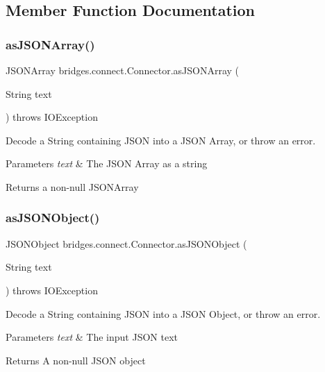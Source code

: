 \subsection{Member Function Documentation}
\mbox{\label{classbridges_1_1connect_1_1_connector_aa5bd647713545fa24c6d730eacb6bc54}} 
\subsubsection{\texorpdfstring{asJSONArray()}{asJSONArray()}}
{\footnotesize\ttfamily J\+S\+O\+N\+Array bridges.\+connect.\+Connector.\+as\+J\+S\+O\+N\+Array (\begin{DoxyParamCaption}\item[{String}]{text }\end{DoxyParamCaption}) throws I\+O\+Exception}

Decode a String containing J\+S\+ON into a J\+S\+ON Array, or throw an error. 
\begin{DoxyParams}{Parameters}
{\em text} & The J\+S\+ON Array as a string \\
\hline
\end{DoxyParams}
\begin{DoxyReturn}{Returns}
a non-\/null J\+S\+O\+N\+Array 
\end{DoxyReturn}
\mbox{\label{classbridges_1_1connect_1_1_connector_aac3fb75dd7975c4439cfd1bf6cefe0a6}} 
\subsubsection{\texorpdfstring{asJSONObject()}{asJSONObject()}}
{\footnotesize\ttfamily J\+S\+O\+N\+Object bridges.\+connect.\+Connector.\+as\+J\+S\+O\+N\+Object (\begin{DoxyParamCaption}\item[{String}]{text }\end{DoxyParamCaption}) throws I\+O\+Exception}

Decode a String containing J\+S\+ON into a J\+S\+ON Object, or throw an error. 
\begin{DoxyParams}{Parameters}
{\em text} & The input J\+S\+ON text \\
\hline
\end{DoxyParams}
\begin{DoxyReturn}{Returns}
A non-\/null J\+S\+ON object 
\end{DoxyReturn}
\mbox{\label{classbridges_1_1connect_1_1_connector_ac0a6f796f1ebcf312b89a7d233c8ac91}} 
